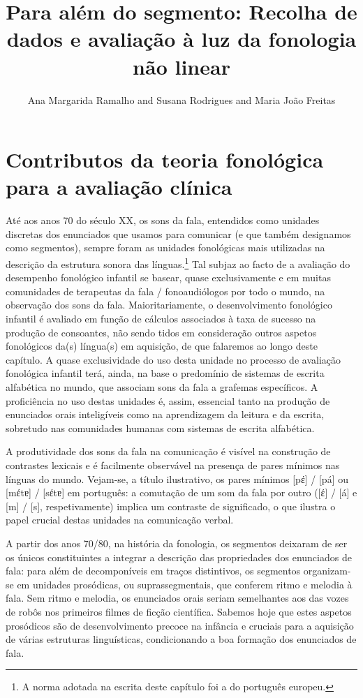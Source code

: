 \documentclass[output=paper,colorlinks,citecolor=brown,booklanguage=portuguese]{langscibook}
\title[Para além do segmento]{Para além do segmento: Recolha de dados e avaliação à luz da fonologia não linear}
\author{Ana Margarida Ramalho\affiliation{Universidade de Lisboa, Faculdade de Letras, Centro de Linguística; Hospital do Espírito Santo de Évora} and  Susana Rodrigues\affiliation{Universidade de Lisboa, Faculdade de Letras, Centro de Linguística; Universidade do Algarve} and  Maria João Freitas\affiliation{Universidade de Lisboa, Faculdade de Letras, Centro de Linguística}}
\begin{document}
\maketitle

\section{Contributos da teoria fonológica para a avaliação clínica }\label{sec:cap6sec1}
Até aos anos 70 do século XX, os sons da fala, entendidos como unidades discretas dos enunciados que usamos para comunicar (e que também designamos como segmentos), sempre foram as unidades fonológicas mais utilizadas na descrição da estrutura sonora das línguas.\footnote{A norma adotada na escrita deste capítulo foi a do português europeu.}
Tal subjaz ao facto de a avaliação do desempenho fonológico infantil se basear, quase exclusivamente e em muitas comunidades de terapeutas da fala / fonoaudiólogos por todo o mundo, na observação dos sons da fala. Maioritariamente, o desenvolvimento fonológico infantil é avaliado em função de cálculos associados à taxa de sucesso na produção de consoantes, não sendo tidos em consideração outros aspetos fonológicos da(s) língua(s) em aquisição, de que falaremos ao longo deste capítulo. A quase exclusividade do uso desta unidade no processo de avaliação fonológica infantil terá, ainda, na base o predomínio de sistemas de escrita alfabética no mundo, que associam sons da fala a grafemas específicos. A proficiência no uso destas unidades é, assim, essencial tanto na produção de enunciados orais inteligíveis como na aprendizagem da leitura e da escrita, sobretudo nas comunidades humanas com sistemas de escrita alfabética.

A produtividade dos sons da fala na comunicação é visível na construção de contrastes lexicais e é facilmente observável na presença de pares mínimos nas línguas do mundo. Vejam-se, a título ilustrativo, os pares mínimos [pέ] / [pá] ou [mέtɐ] / [sέtɐ] em português: a comutação de um som da fala por outro ([έ] / [á] e [m] / [s], respetivamente) implica um contraste de significado, o que ilustra o papel crucial destas unidades na comunicação verbal. 

A partir dos anos 70/80, na história da fonologia, os segmentos deixaram de ser os únicos constituintes a integrar a descrição das propriedades dos enunciados de fala: para além de decomponíveis em traços distintivos, os segmentos orga\-nizam-se em unidades prosódicas, ou suprassegmentais, que conferem ritmo e melodia à fala. Sem ritmo e melodia, os enunciados orais seriam semelhantes aos das vozes de robôs nos primeiros filmes de ficção científica. Sabemos hoje que estes aspetos prosódicos são de desenvolvimento precoce na infância e cruciais para a aquisição de várias estruturas linguísticas, condicionando a boa formação dos enunciados de fala. 
\end{document}
